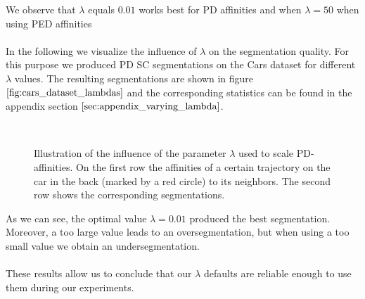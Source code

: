 We observe that $\lambda$ equals $0.01$ works best for PD affinities and when $\lambda = 50$ when using PED affinities \\ \\
In the following we visualize the influence of $\lambda$ on the segmentation quality. For this purpose we produced PD SC segmentations on the Cars dataset for different $\lambda$ values. The resulting segmentations are shown in figure $\ref{fig:cars_dataset_lambdas}$ and the corresponding statistics can be found in the appendix section $\ref{sec:appendix_varying_lambda}$.
\begin{figure}[H]
\begin{center}
~
\end{center}
\caption[Influence varying $\lambda$]{Illustration of the influence of the parameter $\lambda$ used to scale PD-affinities. On the first row the affinities of a certain trajectory on the car in the back (marked by a red circle) to its neighbors. The second row shows the corresponding segmentations.}
\label{fig:cars_dataset_lambdas}
\end{figure}
As we can see, the optimal value $\lambda = 0.01$ produced the best segmentation. Moreover, a too large value leads to an oversegmentation, but when using a too small value we obtain an undersegmentation. \\ \\
These results allow us to conclude that our $\lambda$ defaults are reliable enough to use them during our experiments.


